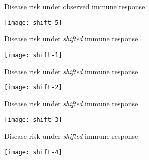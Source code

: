 \documentclass{beamer}
\begin{document}

\begin{frame}[c]{Disease risk under observed immune response}

\hspace*{-1cm}\texttt{[image: shift-5]}

\note{
}

\end{frame}


\begin{frame}[c]{Disease risk under \textit{shifted} immune response}

\hspace*{-1cm}\texttt{[image: shift-1]}

\note{
}

\end{frame}


\begin{frame}[c]{Disease risk under \textit{shifted} immune response}

\hspace*{-1cm}\texttt{[image: shift-2]}

\note{
}

\end{frame}


\begin{frame}[c]{Disease risk under \textit{shifted} immune response}

\hspace*{-1cm}\texttt{[image: shift-3]}

\note{
}

\end{frame}


\begin{frame}[c]{Disease risk under \textit{shifted} immune response}

\hspace*{-1cm}\texttt{[image: shift-4]}

\note{
}

\end{frame}
\end{document}
